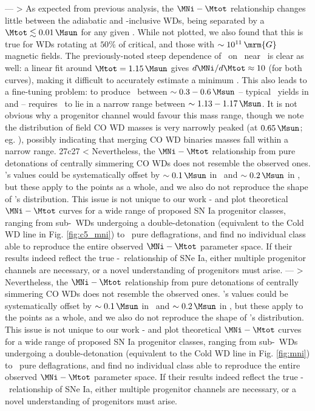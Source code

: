 ---
> As expected from previous analysis, the $\MNi-\Mtot$ relationship changes little between the adiabatic and \dnabconv-inclusive WDs, being separated by a $\Mtot\lesssim0.01\,\Msun$ for any given \MNi.  While not plotted, we also found that this is true for WDs rotating at $50$\% of critical, and those with $\sim10^{11}\,\mrm{G}$ magnetic fields.  The previously-noted steep dependence of \MNi\ on \Mtot\ near \Mcrit\ is clear as well: a linear fit around $\Mtot = 1.15\,\Msun$ gives $d\MNi/d\Mtot \approx 10$ (for both curves), making it difficult to accurately estimate a minimum \MNi.  This also leads to a fine-tuning problem: to produce \MNi\ between $\sim0.3-0.6\,\Msun$ -- typical \MNi\ yields in \cite{scalzrs14} and \cite{chil+15} -- requires \Mtot\ to lie in a narrow range between $\sim 1.13 - 1.17\,\Msun$.  It is not obvious why a progenitor channel would favour this mass range, though we note the distribution of field CO WD masses is very narrowly peaked (at $0.65\,\Msun$; eg. \citealt{tremb09, klei+13}), possibly indicating that merging CO WD binaries masses fall within a narrow range.
27c27
< Nevertheless, the $\MNi-\Mtot$ relationship from pure detonations of centrally simmering CO WDs does not resemble the observed ones.  \cite{chil+15}'s values could be systematically offset by $\sim 0.1\,\Msun$ in \Mtot\ and $\sim 0.2\,\Msun$ in \MNi, but these apply to the points as a whole, and we also do not reproduce the shape of \cite{chil+15}'s distribution.  This issue is not unique to our work - \cite{scalzrs14} and \cite{chil+15} plot theoretical $\MNi-\Mtot$ curves for a wide range of proposed SN Ia progenitor classes, ranging from sub-\Mch\ WDs undergoing a double-detonation (equivalent to the Cold WD line in Fig. \ref{fig:c5_mni}) to \Mch\ pure deflagrations, and find no individual class able to reproduce the entire observed $\MNi-\Mtot$ parameter space.  If their results indeed reflect the true \Mtot-\Ni\ relationship of SNe Ia, either multiple progenitor channels are necessary, or a novel understanding of progenitors must arise.
---
> Nevertheless, the $\MNi-\Mtot$ relationship from pure detonations of centrally simmering CO WDs does not resemble the observed ones.  \cite{chil+15}'s values could be systematically offset by $\sim 0.1\,\Msun$ in \Mtot\ and $\sim 0.2\,\Msun$ in \MNi, but these apply to the points as a whole, and we also do not reproduce the shape of \cite{chil+15}'s distribution.  This issue is not unique to our work - \cite{scalzrs14} and \cite{chil+15} plot theoretical $\MNi-\Mtot$ curves for a wide range of proposed SN Ia progenitor classes, ranging from sub-\Mch\ WDs undergoing a double-detonation (equivalent to the Cold WD line in Fig. \ref{fig:mni}) to \Mch\ pure deflagrations, and find no individual class able to reproduce the entire observed $\MNi-\Mtot$ parameter space.  If their results indeed reflect the true \Mtot-\Ni\ relationship of SNe Ia, either multiple progenitor channels are necessary, or a novel understanding of progenitors must arise.
